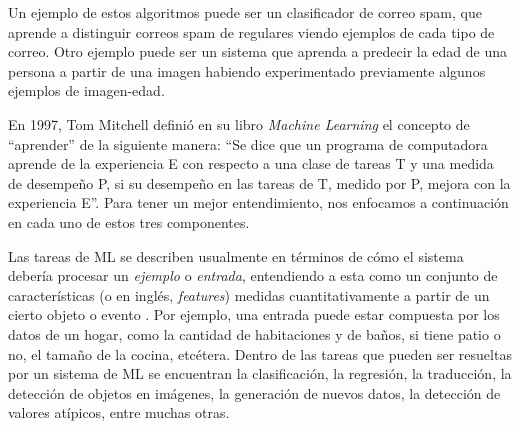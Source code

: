 \documentclass[../../main.tex]{subfiles}
\begin{document}
Un ejemplo de estos algoritmos puede ser un clasificador de correo spam, que aprende a distinguir correos spam de regulares viendo ejemplos de cada tipo de correo. Otro ejemplo puede ser un sistema que aprenda a predecir la edad de una persona a partir de una imagen habiendo experimentado previamente algunos ejemplos de imagen-edad.

En 1997, Tom Mitchell definió en su libro \textit{Machine Learning} \cite{ml-tom-mitchell} el concepto de ``aprender'' de la siguiente manera: ``Se dice que un programa de computadora aprende de la experiencia E con respecto a una clase de tareas T y una medida de desempeño P, si su desempeño en las tareas de T, medido por P, mejora con la experiencia E''. Para tener un mejor entendimiento, nos enfocamos a continuación en cada uno de estos tres componentes.

Las tareas de ML se describen usualmente en términos de cómo el sistema debería procesar un \textit{ejemplo} o \textit{entrada}, entendiendo a esta como un conjunto de características (o en inglés, \textit{features}) medidas cuantitativamente a partir de un cierto objeto o evento \cite{deep-learning}. Por ejemplo, una entrada puede estar compuesta por los datos de un hogar, como la cantidad de habitaciones y de baños, si tiene patio o no, el tamaño de la cocina, etcétera. Dentro de las tareas que pueden ser resueltas por un sistema de ML se encuentran la clasificación, la regresión, la traducción, la detección de objetos en imágenes, la generación de nuevos datos, la detección de valores atípicos, entre muchas otras.
\end{document}
